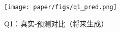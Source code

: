 \begin{figure}[htbp]\centering
  \texttt{[image: paper/figs/q1\_pred.png]}
  \caption{Q1：真实-预测对比（将来生成）}
\end{figure}
